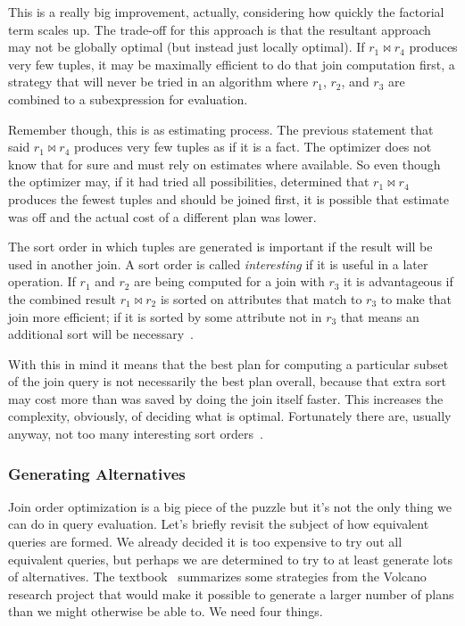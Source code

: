 \documentclass[a4paper]{report}
\begin{document}
This is a really big improvement, actually, considering how quickly the factorial term scales up. The trade-off for this approach is that the resultant approach may not be globally optimal (but instead just locally optimal). If $r_{1} \bowtie r_{4}$ produces very few tuples, it may be maximally efficient to do that join computation first, a strategy that will never be tried in an algorithm where $r_{1}$, $r_{2}$, and $r_{3}$ are combined to a subexpression for evaluation. 

Remember though, this is as estimating process. The previous statement that said $r_{1} \bowtie r_{4}$ produces very few tuples as if it is a fact. The optimizer does not know that for sure and must rely on estimates where available. So even though the optimizer may, if it had tried all possibilities, determined that $r_{1} \bowtie r_{4}$ produces the fewest tuples and should be joined first, it is possible that estimate was off and the actual cost of a different plan was lower.

The sort order in which tuples are generated is important if the result will be used in another join. A sort order is called \textit{interesting} if it is useful in a later operation. If $r_{1}$ and $r_{2}$ are being computed for a join with $r_{3}$ it is advantageous if the combined result $r_{1} \bowtie r_{2}$ is sorted on attributes that match to $r_{3}$ to make that join more efficient; if it is sorted by some attribute not in $r_{3}$ that means an additional sort will be necessary~\cite{dsc}.

With this in mind it means that the best plan for computing a particular subset of the join query is not necessarily the best plan overall, because that extra sort may cost more than was saved by doing the join itself faster. This increases the complexity, obviously, of deciding what is optimal. Fortunately there are, usually anyway, not too many interesting sort orders~\cite{dsc}. 

\subsubsection*{Generating Alternatives}

Join order optimization is a big piece of the puzzle but it's not the only thing we can do in query evaluation. Let's briefly revisit the subject of how equivalent queries are formed. We already decided it is too expensive to try out all equivalent queries, but perhaps we are determined to try to at least generate lots of alternatives. The textbook~\cite{dsc} summarizes some strategies from the Volcano research project that would make it possible to generate a larger number of plans than we might otherwise be able to. We need four things.
\end{document}
